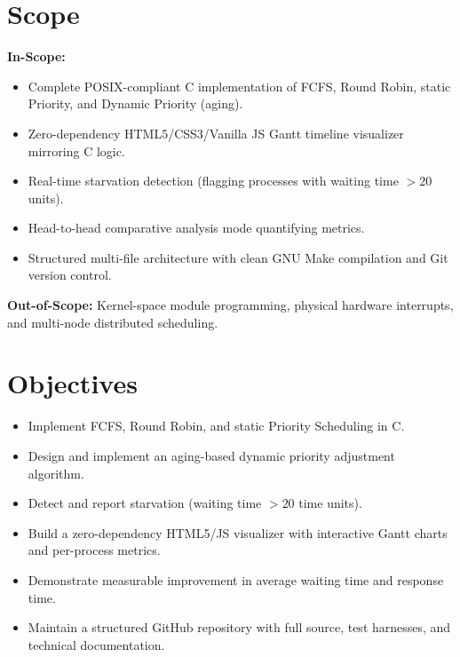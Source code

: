 \documentclass[12pt,a4paper]{report}
\begin{document}
\section{Scope}
\textbf{In-Scope:}
\begin{itemize}[leftmargin=1.5em, itemsep=2pt]
  \item Complete POSIX-compliant C implementation of FCFS, Round Robin, static Priority, and Dynamic Priority (aging).
  \item Zero-dependency HTML5/CSS3/Vanilla JS Gantt timeline visualizer mirroring C logic.
  \item Real-time starvation detection (flagging processes with waiting time $> 20$ units).
  \item Head-to-head comparative analysis mode quantifying metrics.
  \item Structured multi-file architecture with clean GNU Make compilation and Git version control.
\end{itemize}
\textbf{Out-of-Scope:} Kernel-space module programming, physical hardware interrupts, and multi-node distributed scheduling.

\section{Objectives}
\begin{itemize}[leftmargin=1.5em, itemsep=2pt]
  \item Implement FCFS, Round Robin, and static Priority Scheduling in C.
  \item Design and implement an aging-based dynamic priority adjustment algorithm.
  \item Detect and report starvation (waiting time $> 20$ time units).
  \item Build a zero-dependency HTML5/JS visualizer with interactive Gantt charts and per-process metrics.
  \item Demonstrate measurable improvement in average waiting time and response time.
  \item Maintain a structured GitHub repository with full source, test harnesses, and technical documentation.
\end{itemize}
\end{document}
